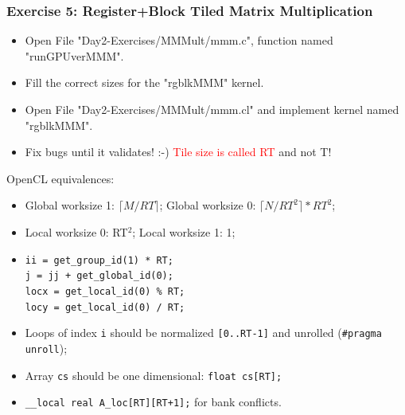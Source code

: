 \documentclass{beamer}
\newcommand{\red}[1]{\textcolor{Red}{{#1}}}
\begin{document}
\begin{frame}[fragile,t]
  \frametitle{Exercise 5: Register+Block Tiled Matrix Multiplication}

\begin{itemize}
    \item Open File "Day2-Exercises/MMMult/mmm.c", function named "runGPUverMMM".
    \item Fill the correct sizes for the "rgblkMMM" kernel.
    \item Open File "Day2-Exercises/MMMult/mmm.cl" and implement kernel named "rgblkMMM".
    \item Fix bugs until it validates! :-)  \red{Tile size is called RT} and not T!
\end{itemize}

OpenCL equivalences: \pause
\begin{itemize}
    \item Global worksize 1: $\lceil M/RT \rceil$; Global worksize 0: $\lceil N/RT^2 \rceil * RT^2$;
    \item Local worksize 0: RT$^2$; Local worksize 1: 1;
    \item {\tt ii = get\_group\_id(1) * RT;}\\
          {\tt j = jj + get\_global\_id(0);}\\
          {\tt locx = get\_local\_id(0) \% RT;}\\
          {\tt locy = get\_local\_id(0) / RT;}\\
    \item Loops of index {\tt i} should be normalized {\tt[0..RT-1]} and unrolled ({\tt \#pragma unroll});
    \item Array {\tt cs} should be one dimensional: {\tt float cs[RT];}
    \item {\tt \_\_local real A\_loc[RT][RT+1];} for bank conflicts.
\end{itemize}

\end{frame}
\end{document}
